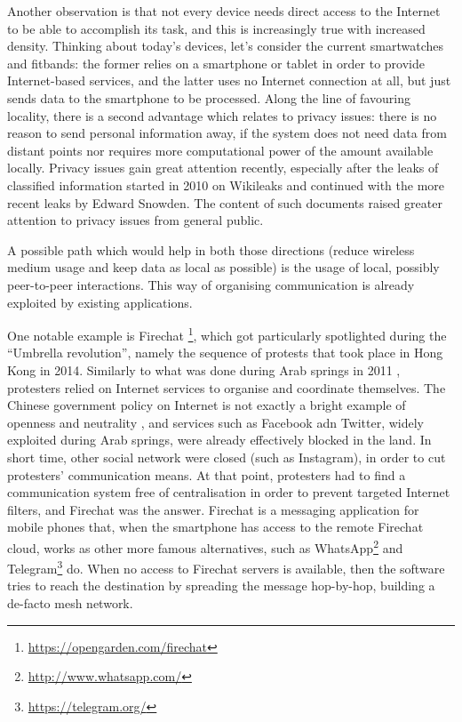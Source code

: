 \documentclass[12pt,a4paper,twoside,openright]{book}
\begin{document}
Another observation is that not every device needs direct access to the Internet to be able to accomplish its task, and this is increasingly true with increased density.
%
Thinking about today's devices, let's consider the current smartwatches and fitbands: the former relies on a smartphone or tablet in order to provide Internet-based services, and the latter uses no Internet connection at all, but just sends data to the smartphone to be processed.
%
Along the line of favouring locality, there is a second advantage which relates to privacy issues: there is no reason to send personal information away, if the system does not need data from distant points nor requires more computational power of the amount available locally.
%
Privacy issues gain great attention recently, especially after the leaks of classified information started in 2010 on Wikileaks and continued with the more recent leaks by Edward Snowden.
%
The content of such documents raised greater attention to privacy issues from general public.

A possible path which would help in both those directions (reduce wireless medium usage and keep data as local as possible) is the usage of local, possibly peer-to-peer interactions.
%
This way of organising communication is already exploited by existing applications.

One notable example is Firechat \footnote{\url{https://opengarden.com/firechat}}, which got particularly spotlighted during the ``Umbrella revolution'', namely the sequence of protests that took place in Hong Kong in 2014.
%
Similarly to what was done during Arab springs in 2011 \cite{arab-spring}, protesters relied on Internet services to organise and coordinate themselves.
%
The Chinese government policy on Internet is not exactly a bright example of openness and neutrality \cite{china-censorship}, and services such as Facebook adn Twitter, widely exploited during Arab springs, were already effectively blocked in the land.
%
In short time, other social network were closed (such as Instagram), in order to cut protesters' communication means.
%
At that point, protesters had to find a communication system free of centralisation in order to prevent targeted Internet filters, and Firechat was the answer.
%
Firechat is a messaging application for mobile phones that, when the smartphone has access to the remote Firechat cloud, works as other more famous alternatives, such as WhatsApp\footnote{\url{http://www.whatsapp.com/}} and Telegram\footnote{\url{https://telegram.org/}} do.
%
When no access to Firechat servers is available, then the software tries to reach the destination by spreading the message hop-by-hop, building a de-facto mesh network.
\end{document}
